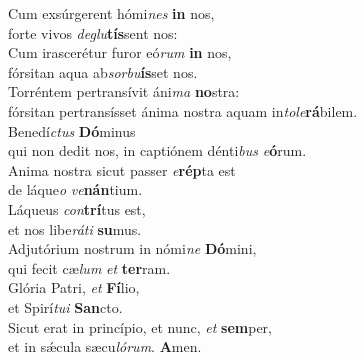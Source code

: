 \evenverse Cum exsúrgerent hómi\textit{nes} \textbf{in} nos,~\*\\
\evenverse forte vivos \textit{de}\textit{glu}\textbf{tís}sent nos:\\
\oddverse Cum irascerétur furor eó\textit{rum} \textbf{in} nos,~\*\\
\oddverse fórsitan aqua ab\textit{sor}\textit{bu}\textbf{ís}set nos.\\
\evenverse Torréntem pertransívit áni\textit{ma} \textbf{no}stra:~\*\\
\evenverse fórsitan pertransísset ánima nostra aquam in\textit{to}\textit{le}\textbf{rá}bilem.\\
\oddverse Benedí\textit{ctus} \textbf{Dó}minus~\*\\
\oddverse qui non dedit nos, in captiónem dénti\textit{bus} \textit{e}\textbf{ó}rum.\\
\evenverse Anima nostra sicut passer \textit{e}\textbf{rép}ta est~\*\\
\evenverse de láque\textit{o} \textit{ve}\textbf{nán}tium.\\
\oddverse Láqueus \textit{con}\textbf{trí}tus est,~\*\\
\oddverse et nos libe\textit{rá}\textit{ti} \textbf{su}mus.\\
\evenverse Adjutórium nostrum in nómi\textit{ne} \textbf{Dó}mini,~\*\\
\evenverse qui fecit cæ\textit{lum} \textit{et} \textbf{ter}ram.\\
\oddverse Glória Patri, \textit{et} \textbf{Fí}lio,~\*\\
\oddverse et Spirí\textit{tu}\textit{i} \textbf{San}cto.\\
\evenverse Sicut erat in princípio, et nunc, \textit{et} \textbf{sem}per,~\*\\
\evenverse et in sǽcula sæcu\textit{ló}\textit{rum}. \textbf{A}men.\\
